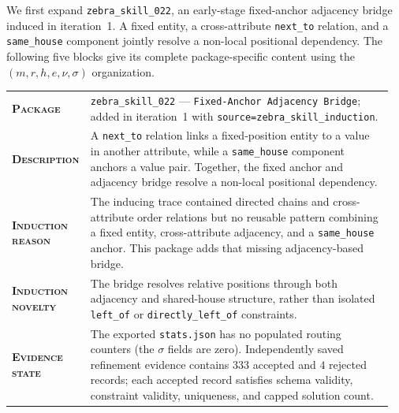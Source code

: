 We first expand \texttt{zebra\_skill\_022}, an early-stage fixed-anchor adjacency bridge induced in iteration~1. A fixed entity, a cross-attribute \texttt{next\_to} relation, and a \texttt{same\_house} component jointly resolve a non-local positional dependency. The following five blocks give its complete package-specific content using the $(m,r,h,e,\nu,\sigma)$ organization.

\begin{table}[htbp]
\centering
\begin{minipage}{0.97\textwidth}
\raggedright
\small
\setlength{\tabcolsep}{3pt}
\renewcommand{\arraystretch}{1.16}
\vspace{0.35em}
\begin{tabular}{@{}>{\raggedright\arraybackslash\bfseries}p{0.17\linewidth} >{\raggedright\arraybackslash}p{0.79\linewidth}@{}}
    \textsc{Package} & \texttt{zebra\_skill\_022} --- \texttt{Fixed-Anchor Adjacency Bridge}; added in iteration~1 with \texttt{source=zebra\_skill\_induction}. \\
    \textsc{Description} & A \texttt{next\_to} relation links a fixed-position entity to a value in another attribute, while a \texttt{same\_house} component anchors a value pair. Together, the fixed anchor and adjacency bridge resolve a non-local positional dependency. \\
    \textsc{Induction reason} & The inducing trace contained directed chains and cross-attribute order relations but no reusable pattern combining a fixed entity, cross-attribute adjacency, and a \texttt{same\_house} anchor. This package adds that missing adjacency-based bridge. \\
    \textsc{Induction novelty} & The bridge resolves relative positions through both adjacency and shared-house structure, rather than isolated \texttt{left\_of} or \texttt{directly\_left\_of} constraints. \\
    \textsc{Evidence state} & The exported \texttt{stats.json} has no populated routing counters (the $\sigma$ fields are zero). Independently saved refinement evidence contains $333$ accepted and $4$ rejected records; each accepted record satisfies schema validity, constraint validity, uniqueness, and capped solution count. \\
\end{tabular}
\vspace{0.45em}
\end{minipage}
\end{table}

